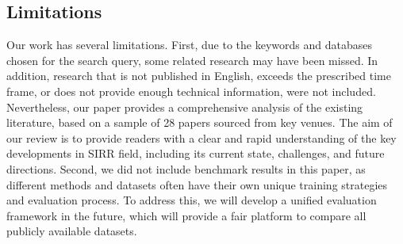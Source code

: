 \subsection{Limitations}
Our work has several limitations. First, due to the keywords and databases chosen for the search query, some related research may have been missed. In addition, research that is not published in English, exceeds the prescribed time frame, or does not provide enough technical information, were not included. Nevertheless, our paper provides a comprehensive analysis of the existing literature, based on a sample of 28 papers sourced from key venues. The aim of our review is to provide readers with a clear and rapid understanding of the key developments in SIRR field, including its current state, challenges, and future directions. Second, we did not include benchmark results in this paper, as different methods and datasets often have their own unique training strategies and evaluation process. To address this, we will develop a unified evaluation framework in the future, which will provide a fair platform to compare all publicly available datasets.

